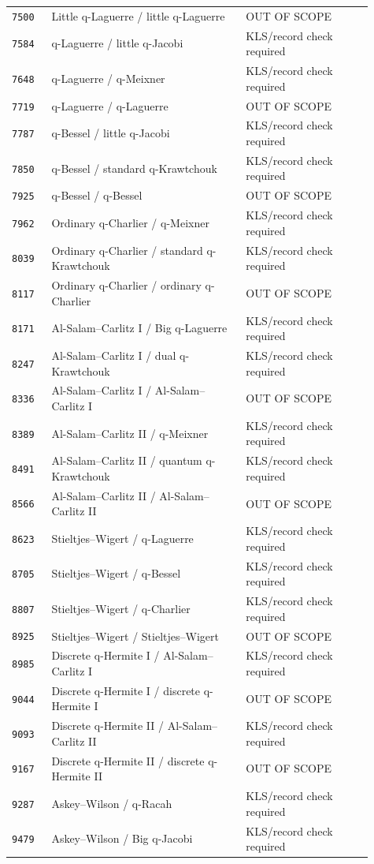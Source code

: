 \documentclass[11pt]{article}
\begin{document}
\begin{longtable}{@{}p{0.10\linewidth}p{0.49\linewidth}p{0.32\linewidth}@{}}
\texttt{7500} & Little q-Laguerre / little q-Laguerre & OUT OF SCOPE \\
\texttt{7584} & q-Laguerre / little q-Jacobi & KLS/record check required \\
\texttt{7648} & q-Laguerre / q-Meixner & KLS/record check required \\
\texttt{7719} & q-Laguerre / q-Laguerre & OUT OF SCOPE \\
\texttt{7787} & q-Bessel / little q-Jacobi & KLS/record check required \\
\texttt{7850} & q-Bessel / standard q-Krawtchouk & KLS/record check required \\
\texttt{7925} & q-Bessel / q-Bessel & OUT OF SCOPE \\
\texttt{7962} & Ordinary q-Charlier / q-Meixner & KLS/record check required \\
\texttt{8039} & Ordinary q-Charlier / standard q-Krawtchouk & KLS/record check required \\
\texttt{8117} & Ordinary q-Charlier / ordinary q-Charlier & OUT OF SCOPE \\
\texttt{8171} & Al-Salam--Carlitz I / Big q-Laguerre & KLS/record check required \\
\texttt{8247} & Al-Salam--Carlitz I / dual q-Krawtchouk & KLS/record check required \\
\texttt{8336} & Al-Salam--Carlitz I / Al-Salam--Carlitz I & OUT OF SCOPE \\
\texttt{8389} & Al-Salam--Carlitz II / q-Meixner & KLS/record check required \\
\texttt{8491} & Al-Salam--Carlitz II / quantum q-Krawtchouk & KLS/record check required \\
\texttt{8566} & Al-Salam--Carlitz II / Al-Salam--Carlitz II & OUT OF SCOPE \\
\texttt{8623} & Stieltjes--Wigert / q-Laguerre & KLS/record check required \\
\texttt{8705} & Stieltjes--Wigert / q-Bessel & KLS/record check required \\
\texttt{8807} & Stieltjes--Wigert / q-Charlier & KLS/record check required \\
\texttt{8925} & Stieltjes--Wigert / Stieltjes--Wigert & OUT OF SCOPE \\
\texttt{8985} & Discrete q-Hermite I / Al-Salam--Carlitz I & KLS/record check required \\
\texttt{9044} & Discrete q-Hermite I / discrete q-Hermite I & OUT OF SCOPE \\
\texttt{9093} & Discrete q-Hermite II / Al-Salam--Carlitz II & KLS/record check required \\
\texttt{9167} & Discrete q-Hermite II / discrete q-Hermite II & OUT OF SCOPE \\
\texttt{9287} & Askey--Wilson / q-Racah & KLS/record check required \\
\texttt{9479} & Askey--Wilson / Big q-Jacobi & KLS/record check required \\
\end{longtable}\endgroup
\end{document}
